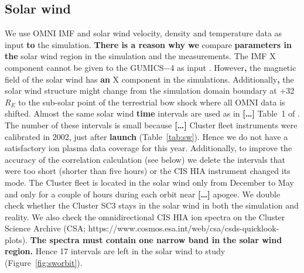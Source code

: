 \documentclass[linenumbers,draft]{agujournal}
\begin{document}
\subsection{Solar wind}
\label{sec:sw}

We use OMNI IMF and solar wind velocity, density and temperature data as input \textbf{to} the simulation. \textbf{There is a reason why we} compare \textbf{parameters in the} solar wind region in the simulation and the measurements. The IMF X component cannot be given to the GUMICS$-$4 as input \citep{janhunen12:_gumic_mhd,facsko16:_one_earth}. However\textbf{,} the magnetic field of the solar wind has \textbf{an} X component in the simulations. Additionally\textbf{,} the solar wind structure might change from the simulation domain boundary at +32\,$R_E$ to the sub-solar point of the terrestrial bow shock where all OMNI data is shifted. Almost the same solar wind \textbf{time} intervals are used as in \textbf{[\dots]} Table~1 of \citet{facsko16:_one_earth}. The number of these intervals is small because \textbf{[\dots]} Cluster fleet instruments were calibrated in 2002, just after \textbf{launch} (Table~\ref{tab:sw}). Hence we do not have a satisfactory ion plasma data coverage for this year. Additionally, to improve the accuracy of the correlation calculation (see below) we delete the intervals that were too short (shorter than five hours) or the CIS HIA instrument changed its mode. The Cluster fleet is located in the solar wind only from December to May and only for a couple of hours during each orbit near \textbf{[\dots]} apogee. We double check whether the Cluster SC3 stays in the solar wind in both the simulation and reality. We also check the omnidirectional CIS HIA ion spectra on the Cluster Science Archive (CSA; https://www.cosmos.esa.int/web/csa/csds-quicklook-plots). \textbf{The spectra must contain one narrow band in the solar wind region.} Hence 17 intervals are left in the solar wind to study (Figure~\ref{fig:sworbit}). 
\end{document}

